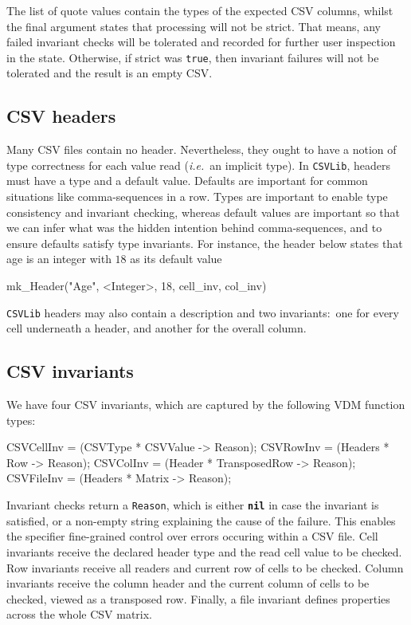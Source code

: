 \documentclass[runningheads,a4paper]{llncs}
\begin{document}
The list of quote values contain the types of the expected CSV columns, whilst the final argument states that processing will not be strict. That means, any failed invariant checks will be tolerated and recorded for further user inspection in the state. Otherwise, if strict was \texttt{true}, then invariant failures will not be tolerated and the result is an empty CSV\@.      

\subsection*{CSV headers}\label{subsec:Headers}

Many CSV files contain no header. Nevertheless, they ought to have a notion of type correctness for each value read (\textit{i.e.}~an implicit type). In \texttt{CSVLib}, headers must have a type and a default value. Defaults are important for common situations like comma-sequences in a row. Types are important to enable type consistency and invariant checking, whereas default values are important so that we can infer what was the hidden intention behind comma-sequences, and to ensure defaults satisfy type invariants. For instance, the header below states that age is an integer with \(18\) as its default value
%
\begin{vdmsl}[frame=none,basicstyle=\ttfamily\scriptsize]
    mk_Header("Age", <Integer>, 18, cell_inv, col_inv)
\end{vdmsl}
%
\texttt{CSVLib} headers may also contain a description and two invariants:~one for every cell underneath a header, and another for the overall column.  

\subsection*{CSV invariants}\label{subsec:Invariants}

We have four CSV invariants, which are captured by the following VDM function types: 
%
\begin{vdmsl}[frame=none,basicstyle=\ttfamily\scriptsize]
    CSVCellInv = (CSVType * CSVValue -> Reason);
    CSVRowInv  = (Headers * Row -> Reason);
    CSVColInv  = (Header  * TransposedRow -> Reason);
    CSVFileInv = (Headers * Matrix -> Reason);
\end{vdmsl}
%
Invariant checks return a \texttt{Reason}, which is either \texttt{\textbf{nil}} in case the invariant is satisfied, or a non-empty string explaining the cause of the failure. This enables the specifier fine-grained control over errors occuring within a CSV file. Cell invariants receive the declared header type and the read cell value to be checked. Row invariants receive all readers and current row of cells to be checked. Column invariants receive the column header and the current column of cells to be checked, viewed as a transposed row. Finally, a file invariant defines properties across the whole CSV matrix.     
\end{document}
